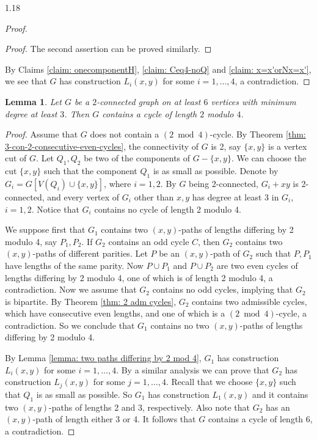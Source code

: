 \documentclass[10pt]{article}
\newtheorem{lemma}[theorem]{Lemma}
\begin{document}
\begin{spacing}{1.18}
\begin{proof}
\begin{proof}
    The second assertion can be proved similarly.
\end{proof}

By Claims \ref{claim: onecomponentH}, \ref{claim: Ceq4-noQ} and \ref{claim: x=x'orNx=x'}, we see that $G$ has construction $L_i(x,y)$ for some $i=1,\ldots,4$, a contradiction.
\end{proof}

\begin{lemma}\label{lemma: 2 mod 4 cycle}
    Let $G$ be a $2$-connected graph on at least $6$ vertices with minimum degree at least $3$. Then $G$ contains a cycle of length $2$ modulo $4$.
\end{lemma}

\begin{proof}
    Assume that $G$ does not contain a $(2\bmod 4)$-cycle. By Theorem \ref{thm: 3-con-2-consecutive-even-cycles}, the connectivity of $G$ is 2, say $\{x,y\}$ is a vertex cut of $G$. Let $Q_1,Q_2$ be two of the components of $G-\{x,y\}$. We can choose the cut $\{x,y\}$ such that the component $Q_1$ is as small as possible. Denote by $G_i=G[V(Q_i)\cup \{x,y\}]$, where $i=1,2$. By $G$ being 2-connected, $G_i+xy$ is 2-connected, and every vertex of $G_i$ other than $x,y$ has degree at least 3 in $G_i$, $i=1,2$. Notice that $G_i$ contains no cycle of length 2 modulo 4. 
    
    We suppose first that $G_1$ contains two $(x,y)$-paths of lengths differing by 2 modulo 4, say $P_1, P_2$. If $G_2$ contains an odd cycle $C$, then $G_2$ contains two $(x,y)$-paths of different parities. Let $P$ be an $(x,y)$-path of $G_2$ such that $P,P_1$ have lengths of the same parity. Now $P\cup P_1$ and $P\cup P_2$ are two even cycles of lengths differing by 2 modulo 4, one of which is of length 2 modulo 4, a contradiction. Now we assume that $G_2$ contains no odd cycles, implying that $G_2$ is bipartite. By Theorem \ref{thm: 2 adm cycles}, $G_2$ contains two admissible cycles, which have consecutive even lengths, and one of which is a $(2\bmod 4)$-cycle, a contradiction. So we conclude that $G_1$ contains no two $(x,y)$-paths of lengths differing by 2 modulo 4.

    By Lemma \ref{lemma: two paths differing by 2 mod 4}, $G_1$ has construction $L_i(x,y)$ for some $i=1,\ldots,4$. By a similar analysis we can prove that $G_2$ has construction $L_j(x,y)$ for some $j=1,\ldots,4$. Recall that we choose $\{x,y\}$ such that $Q_1$ is as small as possible. So $G_1$ has construction $L_1(x,y)$ and it contains two $(x,y)$-paths of lengths 2 and 3, respectively. Also note that $G_2$ has an $(x,y)$-path of length either 3 or 4. It follows that $G$ contains a cycle of length 6, a contradiction.
\end{proof}


\end{spacing}
\end{document}
